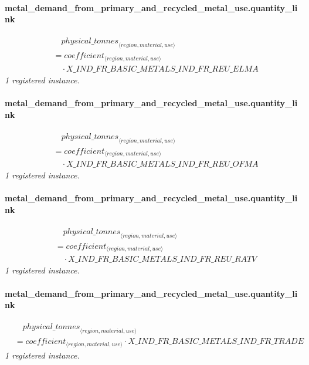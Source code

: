 \documentclass[11pt]{article}
\begin{document}
\paragraph{metal\_demand\_from\_primary\_and\_recycled\_metal\_use.quantity\_link}
\begin{align*}
&\quad {physical\_tonnes}_{\langle region, material, use\rangle}\\
&= coefficient_{\langle region, material, use\rangle}\\
&\quad {}\cdot X\_IND\_FR\_BASIC\_METALS\_IND\_FR\_REU\_ELMA
\end{align*}
\noindent\emph{1 registered instance.}\par
\paragraph{metal\_demand\_from\_primary\_and\_recycled\_metal\_use.quantity\_link}
\begin{align*}
&\quad {physical\_tonnes}_{\langle region, material, use\rangle}\\
&= coefficient_{\langle region, material, use\rangle}\\
&\quad {}\cdot X\_IND\_FR\_BASIC\_METALS\_IND\_FR\_REU\_OFMA
\end{align*}
\noindent\emph{1 registered instance.}\par
\paragraph{metal\_demand\_from\_primary\_and\_recycled\_metal\_use.quantity\_link}
\begin{align*}
&\quad {physical\_tonnes}_{\langle region, material, use\rangle}\\
&= coefficient_{\langle region, material, use\rangle}\\
&\quad {}\cdot X\_IND\_FR\_BASIC\_METALS\_IND\_FR\_REU\_RATV
\end{align*}
\noindent\emph{1 registered instance.}\par
\paragraph{metal\_demand\_from\_primary\_and\_recycled\_metal\_use.quantity\_link}
\begin{align*}
&\quad {physical\_tonnes}_{\langle region, material, use\rangle}\\
&= coefficient_{\langle region, material, use\rangle} \cdot X\_IND\_FR\_BASIC\_METALS\_IND\_FR\_TRADE
\end{align*}
\noindent\emph{1 registered instance.}\par
\end{document}
